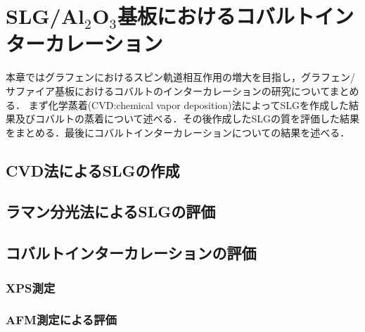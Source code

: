 \chapter{SLG/Al$_{2}$O$_{3}$基板におけるコバルトインターカレーション}

本章ではグラフェンにおけるスピン軌道相互作用の増大を目指し，グラフェン/サファイア基板におけるコバルトのインターカレーションの研究についてまとめる．
まず化学蒸着(CVD:chemical vapor deposition)法によってSLGを作成した結果及びコバルトの蒸着について述べる．その後作成したSLGの質を評価した結果をまとめる．最後にコバルトインターカレーションについての結果を述べる．

\section{CVD法によるSLGの作成}




\section{ラマン分光法によるSLGの評価}

\section{コバルトインターカレーションの評価}

\subsection{XPS測定}

\subsection{AFM測定による評価}

